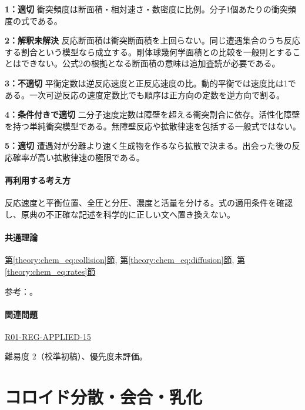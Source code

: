 \noindent\textbf{1：適切} 衝突頻度は断面積・相対速さ・数密度に比例。分子1個あたりの衝突頻度の式である。\par

\noindent\textbf{2：解釈未解決} 反応断面積は衝突断面積を上回らない。同じ遭遇集合のうち反応する割合という模型なら成立する。剛体球幾何学面積との比較を一般則とすることはできない。公式2の根拠となる断面積の意味は追加査読が必要である。\par

\noindent\textbf{3：不適切} 平衡定数は逆反応速度と正反応速度の比。動的平衡では速度比は1である。一次可逆反応の速度定数比でも順序は正方向の定数を逆方向で割る。\par

\noindent\textbf{4：条件付きで適切} 二分子速度定数は障壁を超える衝突割合に依存。活性化障壁を持つ単純衝突模型である。無障壁反応や拡散律速を包括する一般式ではない。\par

\noindent\textbf{5：適切} 遭遇対が分離より速く生成物を作るなら拡散で決まる。出会った後の反応確率が高い拡散律速の極限である。\par

\paragraph{再利用する考え方} 反応速度と平衡位置、全圧と分圧、濃度と活量を分ける。式の適用条件を確認し、原典の不正確な記述を科学的に正しい文へ置き換えない。

\paragraph{共通理論} \hyperref[theory:chem_eq:collision]{第\ref*{theory:chem_eq:collision}節}, \hyperref[theory:chem_eq:diffusion]{第\ref*{theory:chem_eq:diffusion}節}, \hyperref[theory:chem_eq:rates]{第\ref*{theory:chem_eq:rates}節}

\par 参考：\cite{iupac_greenbook2012}。

\paragraph{関連問題} \hyperref[q:r01-reg-applied-15]{R01-REG-APPLIED-15}

\par 難易度 2（校準初稿）、優先度未評価。

\section{コロイド分散・会合・乳化}

